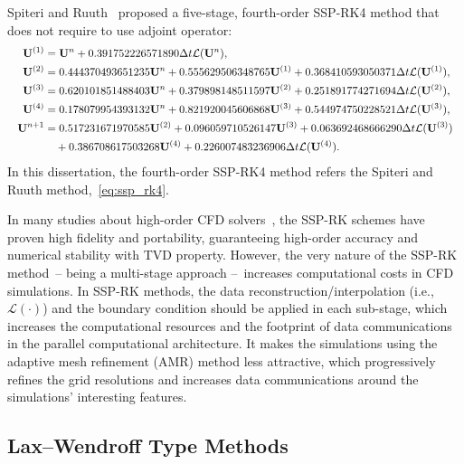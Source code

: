 Spiteri and Ruuth~\cite{spiteri2002new} proposed a five-stage, fourth-order SSP-RK4 method that does not require to use adjoint operator:
\begin{equation}\label{eq:ssp_rk4}
\resizebox{1.0\textwidth}{!}
    {$\begin{split}
        \bU^{(1)} &= \bU^{n} + 0.391752226571890 \dt \mathcal{L}(\bU^{n}), \\
        \bU^{(2)} &= 0.444370493651235 \bU^{n} + 0.555629506348765 \bU^{(1)} + 0.368410593050371 \dt \mathcal{L} (\bU^{(1)}), \\
        \bU^{(3)} &= 0.620101851488403 \bU^{n} + 0.379898148511597 \bU^{(2)} + 0.251891774271694 \dt \mathcal{L} (\bU^{(2)}), \\
        \bU^{(4)} &= 0.178079954393132 \bU^{n} + 0.821920045606868 \bU^{(3)} + 0.544974750228521 \dt \mathcal{L} (\bU^{(3)}), \\
        \bU^{n + 1} &= 0.517231671970585 \bU^{(2)} + 0.096059710526147 \bU^{(3)} + 0.063692468666290 \dt \mathcal{L} (\bU^{(3)}) \\
                    &\quad + 0.386708617503268 \bU^{(4)} + 0.226007483236906 \dt \mathcal{L} (\bU^{(4)}).
    \end{split}$}
\end{equation}
In this dissertation, the fourth-order SSP-RK4 method refers the Spiteri and Ruuth method,~\cref{eq:ssp_rk4}.

In many studies about high-order CFD solvers~\cite{gottlieb1998total,gottlieb2001strong,gottlieb2011strong,mignone2010high,del2003efficient,del2007echo,reyes2018new,reyes2019variable},
the SSP-RK schemes have proven high fidelity and portability, guaranteeing high-order accuracy
and numerical stability with TVD property.
However, the very nature of the SSP-RK method~-- being a multi-stage approach --~increases
computational costs in CFD simulations.
In SSP-RK methods, the data reconstruction/interpolation (i.e., \( \mathcal{L}(\cdot) \)) and the boundary condition
should be applied in each sub-stage, which increases the computational resources
and the footprint of data communications in the parallel computational architecture.
It makes the simulations using the adaptive mesh refinement (AMR) method less attractive,
which progressively refines the grid resolutions
and increases data communications around the simulations’ interesting features.


\subsection{Lax–Wendroff Type Methods}\label{subsec:laxwendroff}

